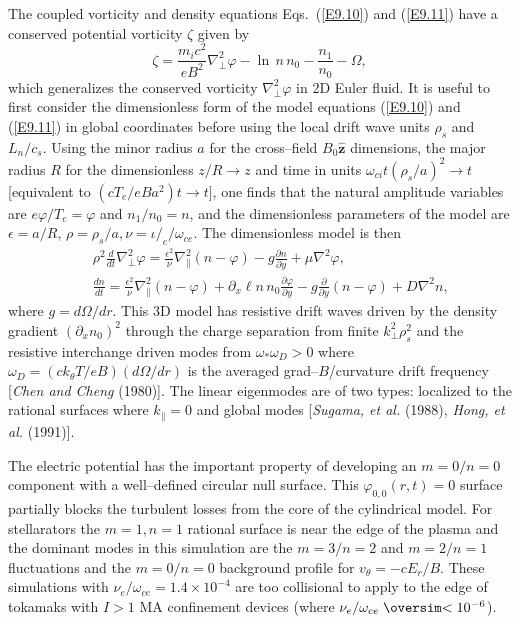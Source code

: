 \documentclass[a4paper,openany,12pt]{book}
\def\nms{\mathsurround=0pt}
\def\ltsim{\mathrel{\mathpalette\oversim<}} %
\def\oversim#1#2{\lower 2pt\vbox{\baselineskip 0pt \lineskip 1pt
    \ialign{$\nms#1\hfil##\hfil$\crcr#2\crcr\sim\crcr}}}
\begin{document}
The coupled vorticity and density equations Eqs.~(\ref{E9.10}) and (\ref{E9.11}) have a conserved potential vorticity $\zeta$ given by
\begin{equation}
\zeta=\frac{m_i c^2}{eB^2}\nabla_\perp^2\varphi-\ln\, n\,n_0-\frac{n_1}{n_0}-\Omega,\label{E9.12}
\end{equation}
which generalizes the conserved vorticity $\nabla_\perp^2\varphi$ in 2D Euler fluid. It is useful to first consider the dimensionless form of the model equations (\ref{E9.10}) and (\ref{E9.11}) in global coordinates before using the local drift wave units $\rho_s$ and $L_n/c_s$. Using the minor radius $a$ for the cross--field $B_0\widehat{\bm{z}}$ dimensions, the major radius $R$ for the dimensionless $z/R\to z$ and time in units $\omega_{ci}t(\rho_s/a)^2\to t$ [equivalent to $(cT_e/eBa^2)t\to t]$, one finds that the natural amplitude variables are $e\varphi/T_e=\varphi$ and $n_1/n_0=n$, and the dimensionless parameters of the model are $\epsilon=a/R$, 
$\rho=\rho_s/a, \nu=\iota/_e/\omega_{ce}$. The dimensionless model is then
\begin{eqnarray}
&&\rho^2\frac{d}{dt}\nabla_\perp^2\varphi=\frac{\epsilon^2}{\nu}\nabla_\|^2(n-\varphi)-g\frac{\partial n}{\partial y}+\mu\nabla^2\varphi, \label{E9.13}\\
&&\frac{dn}{dt}=\frac{\epsilon^2}{\nu}\nabla_\|^2(n-\varphi)+\partial_x\ell n\,n_0\frac{\partial\varphi}{\partial y}-g\frac{\partial}{\partial y}(n-\varphi)+D\nabla^2 n,\label{E9.14}
\end{eqnarray}
where $g=d\Omega/dr$. This 3D model has resistive drift waves driven by the density gradient $(\partial_xn_0)^2$ through the charge separation from finite $k_\perp^2\rho_s^2$ and the resistive interchange driven modes from $\omega_*\omega_D>0$ where $\omega_D=(ck_\theta T/eB)(d\Omega/dr)$ is the averaged grad--$B$/curvature drift frequency [\emph{Chen and Cheng} (1980)]. The linear eigenmodes are of two types: localized to the rational surfaces where $k_\|=0$ and global modes [\emph{Sugama, et al.} (1988), \emph{Hong, et al.} (1991)].

The electric potential has the important property of developing an $m = 0/n = 0$ component with a well--defined circular null surface. This $\varphi_{0,0}(r, t)=0$ surface partially blocks the turbulent losses from the core of the cylindrical model. For stellarators the $m=1, n=1$ rational surface is near the edge of the plasma and the dominant modes in this simulation are the $m = 3/n = 2$ and $m = 2/n = 1$ fluctuations and the $m=0/n=0$ background profile for $v_\theta=-cE_r/B$. These simulations with $\nu_e/\omega_{ce}=1.4\times 10^{-4}$ are too collisional to apply to the edge of tokamaks with $I>1$ MA confinement devices (where $\nu_e/\omega_{ce}\ltsim 10^{-6}$).
\end{document}
